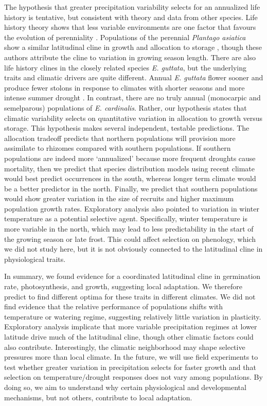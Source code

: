 \documentclass[11pt, oneside]{article}
\begin{document}
The hypothesis that greater precipitation variability selects for an annualized life history is tentative, but consistent with theory and data from other species. Life history theory shows that less variable environments are one factor that favours the evolution of perenniality \citep{Stearns_1976, Iwasa_Cohen_1989, Friedman_Rubin_2015}. Populations of the perennial \textit{Plantago asiatica} show a similar latitudinal cline in growth and allocation to storage \citep{Sawada_etal_1994}, though these authors attribute the cline to variation in growing season length. There are also life history clines in the closely related species \textit{E. guttata}, but the underlying traits and climatic drivers are quite different. Annual \textit{E. guttata} flower sooner and produce fewer stolons in response to climates with shorter seasons and more intense summer drought \citep{Lowry_Willis_2010, Friedman_etal_2015, Kooyers_etal_2015}. In contrast, there are no truly annual (monocarpic and semelparous) populations of \textit{E. cardinalis}. Rather, our hypothesis states that climatic variability selects on quantitative variation in allocation to growth versus storage. This hypothesis makes several independent, testable predictions. The allocation tradeoff predicts that northern populations will provision more assimilate to rhizomes compared with southern populations. If southern populations are indeed more `annualized' because more frequent droughts cause mortality, then we predict that species distribution models using recent climate would best predict occurrences in the south, whereas longer term climate would be a better predictor in the north. Finally, we predict that southern populations would show greater variation in the size of recruits and higher maximum population growth rates. Exploratory analysis also pointed to variation in winter temperature as a potential selective agent. Specifically, winter temperature is more variable in the north, which may lead to less predictability in the start of the growing season or late frost. This could affect selection on phenology, which we did not study here, but it is not obviously connected to the latitudinal cline in physiological traits.

In summary, we found evidence for a coordinated latitudinal cline in germination rate, photosynthesis, and growth, suggesting local adaptation. We therefore predict to find different optima for  these traits in different climates. We did not find evidence that the relative performance of populations shifts with temperature or watering regime, suggesting relatively little variation in plasticity. Exploratory analysis implicate that more variable precipitation regimes at lower latitude drive much of the latitudinal cline, though other climatic factors could also contribute. Interestingly, the climatic neighborhood may shape selective pressures more than local climate. In the future, we will use field experiments to test whether greater variation in precipitation selects for faster growth and that selection on temperature/drought responses does not vary among populations. By doing so, we aim to understand why certain physiological and developmental mechanisms, but not others, contribute to local adaptation.
\end{document}
